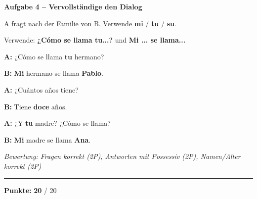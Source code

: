 \documentclass[11pt, a4paper]{article}
\newcommand{\fachfarbe}{spanisch}
\newcommand{\maxpunkte}{20}
\newcommand{\punktebox}[1]{\hfill\fbox{\small \_/#1}}
\newcommand{\lsg}[1]{\textcolor{loesung}{\textbf{#1}}}
\newenvironment{aufgabe}[1]{%
    \needspace{5\baselineskip}%
    \nopagebreak[4]%
    \vspace{10pt}
    \noindent\textbf{\textcolor{\fachfarbe}{Aufgabe #1}}
    \nopagebreak[4]%
    \vspace{5pt}
    \nopagebreak[4]%
    \begin{list}{}{\leftmargin=0pt}
    \item[]
}{%
    \end{list}
}
\newcommand{\es}[1]{\textcolor{\fachfarbe}{\textbf{#1}}}
\begin{document}
\begin{aufgabe}{4 -- Vervollständige den Dialog}
A fragt nach der Familie von B. Verwende \es{mi} / \es{tu} / \es{su}. \punktebox{6}
\end{aufgabe}

\begin{hinweis}
Verwende: \es{¿Cómo se llama tu...?} und \es{Mi ... se llama...}
\end{hinweis}

\vspace{0.5em}

\noindent
\textbf{A:} ¿Cómo se llama \lsg{tu} hermano?

\vspace{0.8em}

\noindent
\textbf{B:} \lsg{Mi} hermano se llama \lsg{Pablo}.

\vspace{0.8em}

\noindent
\textbf{A:} ¿Cuántos años tiene?

\vspace{0.8em}

\noindent
\textbf{B:} Tiene \lsg{doce} años.

\vspace{0.8em}

\noindent
\textbf{A:} ¿Y \lsg{tu} madre? ¿Cómo se llama?

\vspace{0.8em}

\noindent
\textbf{B:} \lsg{Mi} madre se llama \lsg{Ana}.

\vspace{0.5em}
\textit{\textcolor{grau}{Bewertung: Fragen korrekt (2P), Antworten mit Possessiv (2P), Namen/Alter korrekt (2P)}}


\vspace{20pt}
\hrule
\vspace{10pt}

\begin{flushright}
\textbf{Punkte:} \lsg{\maxpunkte} / \maxpunkte
\end{flushright}
\end{document}
